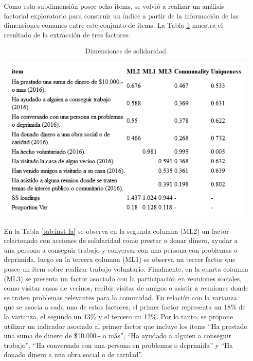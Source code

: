 \documentclass[
  12pt,
]{book}
\begin{document}
Como esta subdimensión posee ocho items, se volvió a realizar un análisis factorial exploratorio para construir un índice a partir de la información de las dimensiones comunes entre este conjunto de items. La Tabla \ref{tab:solidaridad-fa} muestra el resultado de la extracción de tres factores:

\begin{longtable}[]{@{}l@{}}
\caption{\label{tab:solidaridad-fa}Dimensiones de solidaridad.}\tabularnewline
\toprule
\endhead
\includegraphics[width=6.77083in,height=\textheight]{output/tables/solidaridad_fa.png}\tabularnewline
\bottomrule
\end{longtable}

En la Tabla \ref{tab:inst-fa} se observa en la segunda columna (ML2) un factor relacionado con acciones de solidaridad como prestar o donar dinero, ayudar a una persona a conseguir trabajo y conversar con una persona con problemas o deprimida, luego en la tercera columna (ML1) se observa un tercer factor que posee un item sobre realizar trabajo voluntario. Finalmente, en la cuarta columna (ML3) se presenta un factor asociado con la participación en reuniones sociales, como visitar casas de vecinos, recibir visitas de amigos o asistir a reuniones donde se traten problemas relevantes para la comunidad. En relación con la varianza que se asocia a cada uno de estos factores, el primer factor representa un 18\% de la varianza, el segundo un 13\% y el tercero un 12\%. Por lo tanto, se propone utilizar un indicador asociado al primer factor que incluye los items ``Ha prestado una suma de dinero de \$10.000.- o más'', ``Ha ayudado a alguien a conseguir trabajo'', ``Ha conversado con una persona en problemas o deprimida'' y ``Ha donado dinero a una obra social o de caridad''.
\end{document}
